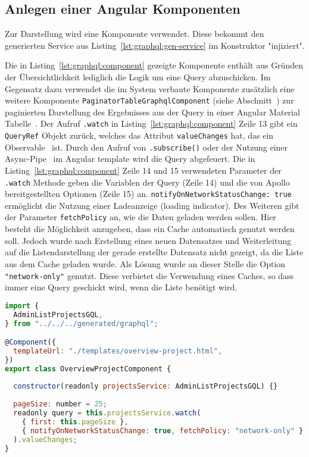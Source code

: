 \subsection{Anlegen einer Angular Komponenten}
\label{impl:graphql:component}

Zur Darstellung wird eine Komponente verwendet. Diese bekommt den generierten Service aus Listing~\ref{lst:graphql:gen-service} im Konstruktor "injiziert". 

Die in Listing~\ref{lst:graphql:component} gezeigte Komponente enthält aus Gründen der Übersichtlichkeit lediglich die Logik um eine Query abzuschicken. Im Gegensatz dazu verwendet die im System verbaute Komponente zusätzlich eine weitere Komponente \texttt{Paginator\-Table\-Graphql\-Component} (siehe Abschnitt~) zur paginierten Darstellung des Ergebnisses aus der Query in einer Angular Material Tabelle~\cite{angular-material-table}.
Der Aufruf \texttt{.watch} in Listing~\ref{lst:graphql:component} Zeile 13 gibt ein \texttt{QueryRef} Objekt zurück, welches das Attribut \texttt{valueChanges} hat, das ein Observable~\cite{angular-observable} ist.
Durch den Aufruf von \texttt{.subscribe()} \cite{angular-subscribe} oder der Nutzung einer Async-Pipe~\cite{angular-async-pipe} im Angular template wird die Query abgefeuert.
Die in Listing~\ref{lst:graphql:component} Zeile 14 und 15 verwendeten Parameter der \texttt{.watch} Methode geben die Variablen der Query (Zeile 14) und die von Apollo bereitgestellten Optionen (Zeile 15) an.
\texttt{notifyOnNetworkStatusChange: true} ermöglicht die Nutzung einer Ladeanzeige (loading indicator). Des Weiteren gibt der Parameter \texttt{fetchPolicy} an, wie die Daten geladen werden sollen. Hier besteht die Möglichkeit anzugeben, dass ein Cache automatisch genutzt werden soll. Jedoch wurde nach Erstellung eines neuen Datensatzes und Weiterleitung auf die Listendarstellung der gerade erstellte Datensatz nicht gezeigt, da die Liste aus dem Cache geladen wurde. Als Lösung wurde an dieser Stelle die Option \texttt{"network-only"} genutzt. Diese verbietet die Verwendung eines Caches, so dass immer eine Query geschickt wird, wenn die Liste benötigt wird.

\begin{lstlisting}[language=JavaScript,float=h!,caption={Angular Komponente zum Anzeigen der Projekte in Listendarstellung}, label={lst:graphql:component}]
import {
  AdminListProjectsGQL,
} from "../../../generated/graphql";

@Component({
  templateUrl: "./templates/overview-project.html",
})
export class OverviewProjectComponent {  
  
  constructor(readonly projectsService: AdminListProjectsGQL) {}
  
  pageSize: number = 25;
  readonly query = this.projectsService.watch(
    { first: this.pageSize },
    { notifyOnNetworkStatusChange: true, fetchPolicy: "network-only" }
  ).valueChanges;
}
\end{lstlisting}

